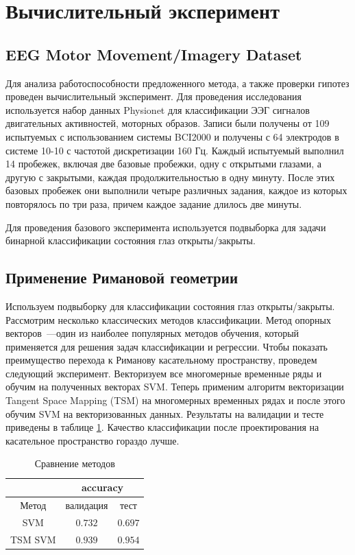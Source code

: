 \documentclass[a4paper, 12pt]{extarticle}
\begin{document}
\section{Вычислительный эксперимент}
\subsection{EEG Motor Movement/Imagery Dataset}
Для анализа работоспособности предложенного метода, а также проверки гипотез
проведен вычислительный эксперимент.
Для проведения исследования используется набор данных Physionet \citep{schalk2004bci2000, EEG_MI} для классификации ЭЭГ сигналов 
двигательных активностей, моторных образов. 
Записи были получены от 109 испытуемых с использованием системы BCI2000 и получены с 64 электродов в системе 10-10 \citep{seeck2017standardized} 
с частотой дискретизации 160 Гц. 
Каждый испытуемый выполнил 14 пробежек, включая две базовые пробежки, одну с открытыми глазами, а другую с закрытыми, 
каждая продолжительностью в одну минуту. После этих базовых пробежек они выполнили четыре различных задания, каждое из которых повторялось по три раза, 
причем каждое задание длилось две минуты.
 
Для проведения базового эксперимента используется подвыборка для задачи бинарной классификации состояния глаз открыты/закрыты.

\subsection*{Применение Римановой геометрии}
Используем подвыборку для классификации состояния глаз открыты/закрыты.
Рассмотрим несколько классических методов классификации. 
Метод опорных векторов~---один из наиболее популярных методов обучения, который применяется для решения задач классификации и регрессии.
Чтобы показать преимущество перехода к Риманову касательному пространству, проведем следующий эксперимент. 
Векторизуем все многомерные временные ряды и обучим на полученных векторах SVM. 
Теперь применим алгоритм векторизации Tangent Space Mapping (TSM) на многомерных временных рядах и после этого обучим SVM на векторизованных данных. 
Результаты на валидации и тесте приведены в таблице \ref{table:Riman}. 
Качество классификации после проектирования на касательное пространство гораздо лучше.

\begin{table}[h!]
	\centering
	\caption{Сравнение методов}
	\begin{tabular}{|c|c|c|}
		\hline
		& \multicolumn{2}{|c|}{accuracy}  \\ \hline 
		Метод & валидация  & тест \\ \hline \hline
		SVM    & $0.732$ & $0.697$      \\ \hline
		TSM SVM    & $0.939$ & $0.954$		\\ \hline
	\end{tabular}
	\label{table:Riman}
\end{table}
\end{document}
